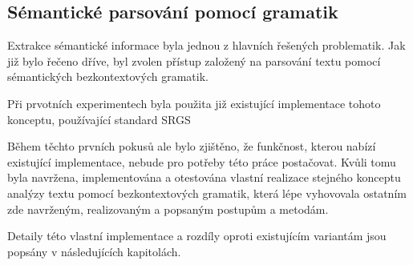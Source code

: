 \subsection{Sémantické parsování pomocí gramatik}\label{subsec:moje_gramatiky}
Extrakce sémantické informace byla jednou z hlavních řešených problematik.
Jak již bylo řečeno dříve, byl zvolen přístup založený na parsování textu pomocí sémantických bezkontextových gramatik.

Při prvotních experimentech byla použita již existující implementace tohoto konceptu,
používající standard SRGS

Během těchto prvních pokusů ale bylo zjištěno, že funkčnost, kterou nabízí existující implementace,
nebude pro potřeby této práce postačovat.
Kvůli tomu byla navržena, implementována a otestována vlastní realizace stejného konceptu
analýzy textu pomocí bezkontextových gramatik, která lépe vyhovovala ostatním zde navrženým,
realizovaným a popsaným postupům a metodám.

Detaily této vlastní implementace a rozdíly oproti existujícím variantám jsou popsány v následujících kapitolách.

